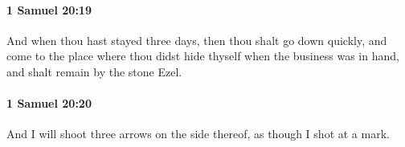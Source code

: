 		\paragraph{1 Samuel 20:19} %
			\label{1SAMUEL-20-19}

			And when thou hast stayed three days, then thou shalt go down quickly, and come to the place where thou didst hide thyself when the business was in hand, and shalt remain by the stone Ezel.


		\paragraph{1 Samuel 20:20} %
			\label{1SAMUEL-20-20}

			And I will shoot three arrows on the side thereof, as though I shot at a mark.


